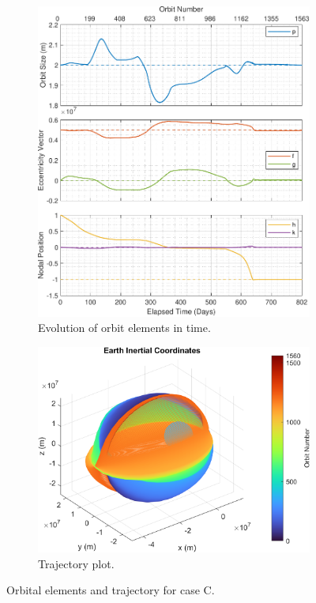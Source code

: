 \begin{figure}[H]
    \centering
    \begin{subfigure}[t]{0.4\textwidth}
        \includegraphics[width=\textwidth]{figures/plane_change/orbital_elements.pdf}
        \caption{Evolution of orbit elements in time.}
        \label{fig:results_c_a}
    \end{subfigure}
    \begin{subfigure}[t]{0.59\textwidth}
        \includegraphics[width=\textwidth]{figures/plane_change/trajectory_plot.png}
        \caption{Trajectory plot.}
        \label{fig:results_c_b}
    \end{subfigure}
    \caption{Orbital elements and trajectory for case C.}
    \label{fig:results_c}
\end{figure}
